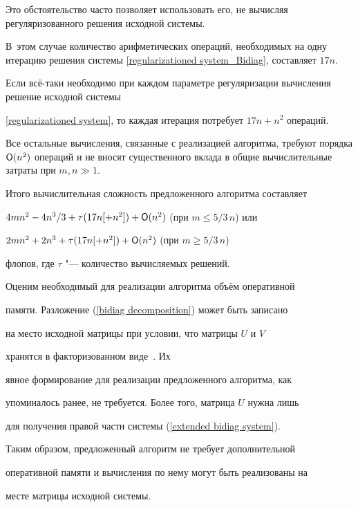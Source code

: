 Это обстоятельство часто позволяет использовать его, не вычисляя регуляризованного решения исходной системы. 

В~этом случае количество арифметических операций, необходимых на одну итерацию решения системы \eqref{regularizationed

system_Bidiag}, составляет $17n$. 

Если всё-таки необходимо при каждом параметре регуляризации вычисления решение исходной системы

\eqref{regularizationed system}, то каждая итерация потребует $17n + n^2$ операций. 

Все остальные вычисления, связанные с реализацией алгоритма, требуют порядка ${\sf O}(n^2)$ операций и не вносят существенного вклада в общие вычислительные затраты при $m, n \gg 1$.



Итого вычислительная сложность предложенного алгоритма составляет

$4mn^2-4n^3/3+\tau (17n[+n^2])+{\sf O}(n^2)$ (при $m \leqslant 5/3 \, n$) или

$2mn^2+2n^3+\tau ({17n[+n^2])}+{\sf O}(n^2)$ (при $m \geqslant 5/3 \, n$)

флопов, где $\tau$ "--- количество вычисляемых решений.



Оценим необходимый для реализации алгоритма объём оперативной

памяти. Разложение (\ref{bidiag decomposition}) может быть записано

на место исходной матрицы при условии, что матрицы $U$ и $V$

хранятся в факторизованном виде~{\cite{dolishzhdanov:bib:golub}}. Их

явное формирование для реализации предложенного алгоритма, как

упоминалось ранее, не требуется. Более того, матрица $U$ нужна лишь

для получения правой части системы (\ref{extended bidiag system}).

Таким образом, предложенный алгоритм не требует дополнительной

оперативной памяти и вычисления по нему могут быть реализованы на

месте матрицы исходной системы.



\smallskip




